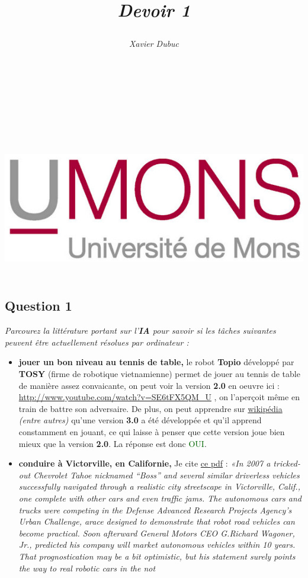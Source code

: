 \documentclass{article}
\title{$ $\\ $ $\\ $ $\\ $ $\\ $ $\\ $ $\\ $ $\\\begin{Huge}\maintitlecolor{Intelligence Artificielle}\end{Huge} \\ 
   $ $ \\ \begin{LARGE}\textit{Devoir 1}\end{LARGE}}
\author{\textit{Xavier Dubuc} \\ \blu{Xavier.DUBUC@student.umons.ac.be} \\ $ $\\ $ $\\ $ $\\ $ $\\ $ $\\ $ $\\ $ $\\ $ 
$ \\ 
\includegraphics{UMONS.jpg}}
\newcommand{\gre}[1]{\textcolor{darkgreen}{#1}}
\newcommand{\term}[1]{\textit{\textcolor{maintitle}{#1}}}
\begin{document}
\begin{sffamily}

\maketitle

\newpage

\tableofcontents

\hbox{}

\newpage

\section{Question 1}

\term{Parcourez la littérature portant sur l'\textbf{IA} pour savoir si les tâches suivantes peuvent être actuellement
résolues par ordinateur : }
\begin{itemize}
\item \textbf{jouer un bon niveau au tennis de table,} le robot \textbf{Topio} développé par \textbf{TOSY} (firme de robotique 
vietnamienne) permet de jouer au tennis de table de manière assez convaicante, on peut voir la version \textbf{2.0} en oeuvre ici 
: \href{http://www.youtube.com/watch?v=SE6tFX5QM\_U}{http://www.youtube.com/watch?v=SE6tFX5QM\_U} , on l'aperçoit même en train de 
battre son adversaire. De plus, on peut apprendre sur \href{http://en.wikipedia.org/wiki/TOPIO}{wikipédia} \textit{(entre autres)} 
qu'une version \textbf{3.0} a été développée et qu'il apprend constamment en jouant, ce qui laisse à penser que cette version joue
bien mieux que la version \textbf{2.0}. La réponse est donc \gre{OUI}.
\item \textbf{conduire à Victorville, en Californie,}
Je cite \href{http://www.cs.kuleuven.ac.be/~dannyd/CrashlessCars.pdf}{ce pdf} : \textit{«In 2007 a tricked-out Chevrolet Tahoe 
nicknamed “Boss” and several similar driverless vehicles successfully navigated through a realistic city streetscape in 
Victorville, Calif., one complete with other cars and even traffic jams. The autonomous cars and trucks were competing in the 
Defense Advanced Research Projects Agency’s Urban Challenge, arace designed to demonstrate that robot road vehicles can become 
practical. Soon afterward General Motors CEO G.Richard Wagoner, Jr., predicted his company will market autonomous vehicles within 
10 years. That prognostication may be a bit optimistic, but his statement surely points the way to real robotic cars in the not 
}
\end{itemize}
\end{sffamily}
\end{document}
